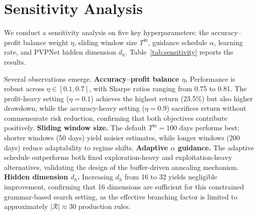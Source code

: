 \begin{table}[htbp]
\centering
\caption{Theoretical Comparison of Distributional Divergences}
\label{tab:divergence_comparison}
\end{table}

\section{Sensitivity Analysis}
\label{app:sensitivity}

We conduct a sensitivity analysis on five key hyperparameters: the accuracy--profit balance weight $\eta$, sliding window size $T^{\text{in}}$, guidance schedule $\alpha$, learning rate, and PVPNet hidden dimension $d_h$. Table~\ref{tab:sensitivity} reports the results.

\begin{table}[htbp]
\centering
\caption{Hyperparameter Sensitivity Analysis}
\label{tab:sensitivity}

\end{table}

Several observations emerge. \textbf{Accuracy--profit balance $\eta$.} Performance is robust across $\eta \in [0.1, 0.7]$, with Sharpe ratios ranging from 0.75 to 0.81. The profit-heavy setting ($\eta=0.1$) achieves the highest return (23.5\%) but also higher drawdown, while the accuracy-heavy setting ($\eta=0.9$) sacrifices return without commensurate risk reduction, confirming that both objectives contribute positively. \textbf{Sliding window size.} The default $T^{\text{in}}=100$ days performs best; shorter windows (50 days) yield noisier estimates, while longer windows (200 days) reduce adaptability to regime shifts. \textbf{Adaptive $\alpha$ guidance.} The adaptive schedule outperforms both fixed exploration-heavy and exploitation-heavy alternatives, validating the design of the buffer-driven annealing mechanism. \textbf{Hidden dimension $d_h$.} Increasing $d_h$ from 16 to 32 yields negligible improvement, confirming that 16 dimensions are sufficient for this constrained grammar-based search setting, as the effective branching factor is limited to approximately $|\mathcal{R}| \approx 30$ production rules.

